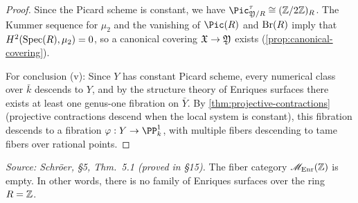 \begin{proof}
  Since the Picard scheme is constant, we have \(\Pic^{\tau}_{\foY/R} \cong (\ZZ/2\ZZ)_R\).
  The Kummer sequence for \(\mu_2\) and the vanishing of \(\Pic(R)\) and \(\operatorname{Br}(R)\) imply that
  \(H^2(\mathrm{Spec}(R), \mu_2) = 0\), so a canonical covering \(\mathfrak{X} \to \mathfrak{Y}\) exists (\cref{prop:canonical-covering}).

  For conclusion (v): Since \(Y\) has constant Picard scheme, every numerical class over \(\bar{k}\) descends to \(Y\),
  and by the structure theory of Enriques surfaces there exists at least one genus-one fibration on \(\bar{Y}\).
  By \cref{thm:projective-contractions} (projective contractions descend when the local system is constant),
  this fibration descends to a fibration \(\varphi : Y \to \PP^1_k\),
  with multiple fibers descending to tame fibers over rational points.
\end{proof}

\begin{theorem}
  \label{thm:no-enriques-over-integers}
  \textit{Source: Schr\"oer, §5, Thm.~5.1 (proved in §15).}
  The fiber category \(\mathscr{M}_{\mathrm{Enr}}(\mathbb{Z})\) is empty.
  In other words, there is no family of Enriques surfaces over the ring \(R = \mathbb{Z}\).
\end{theorem}

